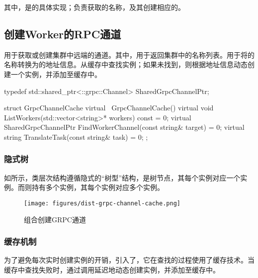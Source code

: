\begin{content}
其中，是的具体实现；负责获取的名称，及其创建相应的。

\subsection{创建Worker的RPC通道}

用于获取或创建集群中远端的通道。其中，用于返回集群中的名称列表。用于将的名称转换为的地址信息。从缓存中查找实例；如果未找到，则根据地址信息动态创建一个实例，并添加至缓存中。

\begin{leftbar}
\begin{c++}
typedef std::shared_ptr<::grpc::Channel> SharedGrpcChannelPtr;

struct GrpcChannelCache {
  virtual ~GrpcChannelCache() {}
  virtual void ListWorkers(std::vector<string>* workers) const = 0;
  virtual SharedGrpcChannelPtr FindWorkerChannel(const string& target) = 0;
  virtual string TranslateTask(const string& task) = 0;
};
\end{c++}
\end{leftbar}

\subsubsection{隐式树}

如所示，类层次结构遵循隐式的“树型”结构，是树节点，其每个实例对应一个实例。而则持有多个实例，其每个实例对应多个实例。

\begin{figure}[H]
\centering
\texttt{[image: figures/dist-grpc-channel-cache.png]}
\caption{组合创建GRPC通道}
 \label{fig:dist-grpc-channel-cache}
\end{figure}

\subsubsection{缓存机制}

为了避免每次实时创建实例的开销，引入了，它在查找的过程使用了缓存技术。当缓存中查找失败时，通过调用延迟地动态创建实例，并添加至缓存中。


\end{content}
